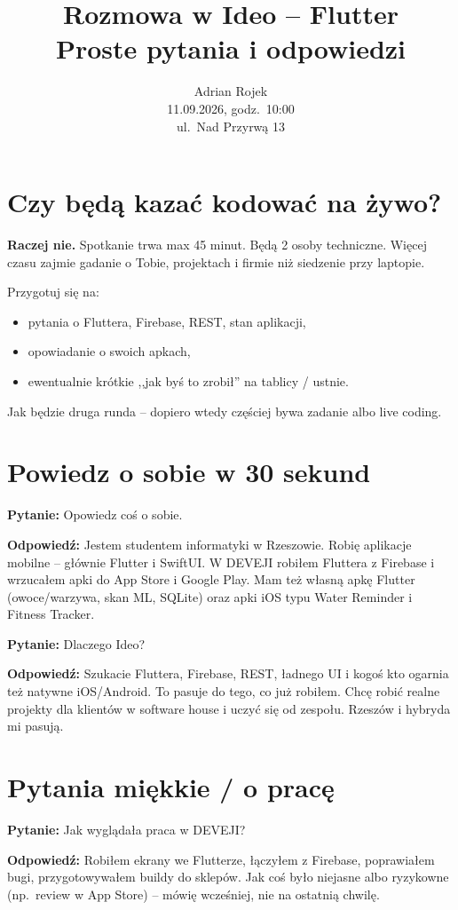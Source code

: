 \documentclass[11pt,a4paper]{article}
\title{Rozmowa w Ideo -- Flutter\\[0.4em]\large Proste pytania i odpowiedzi}
\author{Adrian Rojek\\11.09.2026, godz.\ 10:00\\ul.\ Nad Przyrwą 13}
\date{}
\newcommand{\pyt}[1]{\par\medskip\noindent\textbf{Pytanie:} #1\par}
\newcommand{\odp}[1]{\noindent\textbf{Odpowiedź:} #1\par}
\begin{document}
\maketitle
\tableofcontents
\newpage

\section{Czy będą kazać kodować na żywo?}

\textbf{Raczej nie.} Spotkanie trwa max 45 minut. Będą 2 osoby techniczne. Więcej czasu zajmie gadanie o Tobie, projektach i firmie niż siedzenie przy laptopie.

Przygotuj się na:
\begin{itemize}
  \item pytania o Fluttera, Firebase, REST, stan aplikacji,
  \item opowiadanie o swoich apkach,
  \item ewentualnie krótkie ,,jak byś to zrobił'' na tablicy / ustnie.
\end{itemize}
Jak będzie druga runda -- dopiero wtedy częściej bywa zadanie albo live coding.

\section{Powiedz o sobie w 30 sekund}

\pyt{Opowiedz coś o sobie.}
\odp{Jestem studentem informatyki w Rzeszowie. Robię aplikacje mobilne -- głównie Flutter i SwiftUI. W DEVEJI robiłem Fluttera z Firebase i wrzucałem apki do App Store i Google Play. Mam też własną apkę Flutter (owoce/warzywa, skan ML, SQLite) oraz apki iOS typu Water Reminder i Fitness Tracker.}

\pyt{Dlaczego Ideo?}
\odp{Szukacie Fluttera, Firebase, REST, ładnego UI i kogoś kto ogarnia też natywne iOS/Android. To pasuje do tego, co już robiłem. Chcę robić realne projekty dla klientów w software house i uczyć się od zespołu. Rzeszów i hybryda mi pasują.}

\section{Pytania miękkie / o pracę}

\pyt{Jak wyglądała praca w DEVEJI?}
\odp{Robiłem ekrany we Flutterze, łączyłem z Firebase, poprawiałem bugi, przygotowywałem buildy do sklepów. Jak coś było niejasne albo ryzykowne (np.\ review w App Store) -- mówię wcześniej, nie na ostatnią chwilę.}
\end{document}
